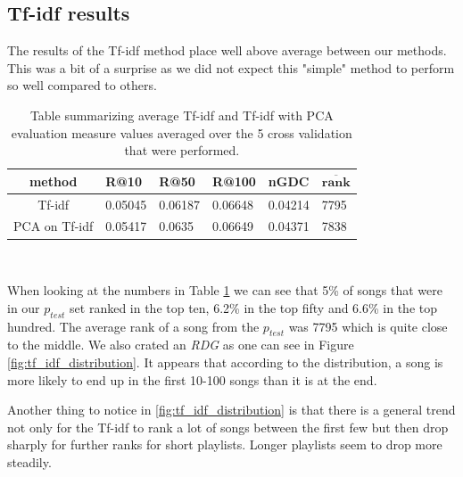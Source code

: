 \subsection{Tf-idf results}\label{ssec:tf_idf_results}

The results of the Tf-idf method place well above average between our methods. This was a bit of a surprise as we did not expect this "simple" method to perform so well compared to others. 

\begin{table}[h]
\centering
\renewcommand{\arraystretch}{1.5}
\begin{tabu} to 1\textwidth {| c || X[c] | X[c] | X[c] | X[c] | X[c] | }
 \hline
 \textbf{method} & \textbf{R@10} & \textbf{R@50} & \textbf{R@100} & \textbf{nGDC} & $ \boldsymbol{\overline{rank}} $ \\
 \hline
 \hline
 Tf-idf & 0.05045 & 0.06187 & 0.06648 & 0.04214 & 7795 \\
 \hline
 PCA on Tf-idf & 0.05417 & 0.0635 & 0.06649 & 0.04371 & 7838 \\
 \hline
\end{tabu} \\
\caption{Table summarizing average Tf-idf and Tf-idf with PCA evaluation measure values averaged over the 5 cross validation that were performed.}
\label{table:1}
\end{table}

When looking at the numbers in Table \ref{table:1} we can see that 5\% of songs that were in our $p_{test}$ set ranked in the top ten, 6.2\% in the top fifty and 6.6\% in the top hundred. The average rank of a song from the $p_{test}$ was 7795 which is quite close to the middle. We also crated an \textit{RDG} as one can see in Figure \ref{fig:tf_idf_distribution}. It appears that according to the distribution, a song is more likely to end up in the first 10-100 songs than it is at the end.

Another thing to notice in \ref{fig:tf_idf_distribution} is that there is a general trend not only for the Tf-idf to rank a lot of songs between the first few but then drop sharply for further ranks for short playlists. Longer playlists seem to drop more steadily.

